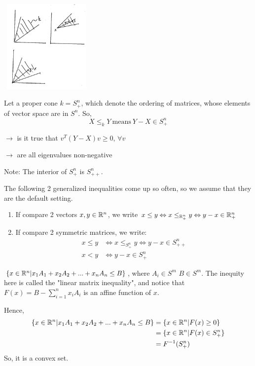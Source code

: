 \begin{marginfigure}
	\centering
	\includegraphics[width=1.8in,height=1.8in]{figures/ch08/figure1030_1.png}
\end{marginfigure}


\begin{example}
	Let a proper cone $k = S^n_+$, which denote the ordering of matrices, whose elements of vector space are in $S^n$. So,
	$$X\leq_k Y\ \text{means}\ Y-X\in S^n_+$$
	
	$\rightarrow$ is it true that $v^T(Y-X)v \geq 0$, $\forall v$
	
	$\rightarrow$ are all eigenvalues non-negative
	
	Note: The interior of $S_+^n$ is $S^n_{++}$.
	
\end{example}

\vspace{0.3cm}
The following 2 generalized inequalities come up so often, so we assume that they are the default setting.
\begin{enumerate}
	\item If compare 2 vectors $x,y\in \mathbb{R}^n$, we write $x\leq  y\Leftrightarrow x\leq_{\mathbb{R}^n_{+}}y \Leftrightarrow y-x\in \mathbb{R}^n_{+}$ 
	
	\item If compare 2 symmetric matrices, we write:
	\begin{align*}
	x\leq y &\Leftrightarrow x\leq_{S_+^n} y\Leftrightarrow y - x\in S^n_{++}\\
	x< y &\Leftrightarrow y - x\in S^n_{+}
	\end{align*}
\end{enumerate}

\begin{example}
$\{x\in \mathbb{R}^n | x_1A_1 + x_2A_2 + ... + x_nA_n \leq B\}$, where $A_i\in S^m$ $B\in S^m$. The inequity here is called the "linear matrix inequality", and notice that $F(x) = B - \sum^n_{i=1}x_iA_i$ is an affine function of $x$. 

Hence,
\begin{align*}
\{x\in \mathbb{R}^n | x_1A_1 + x_2A_2 + ... + x_nA_n \leq B\}
 &= \{x\in \mathbb{R}^n | F(x)\geq 0\}\\
 &= \{x\in \mathbb{R}^n | F(x)\in S^n_+ \}\\
 &=F^{-1}(S^n_+)
\end{align*}
So, it is a convex set.\\
\end{example}

